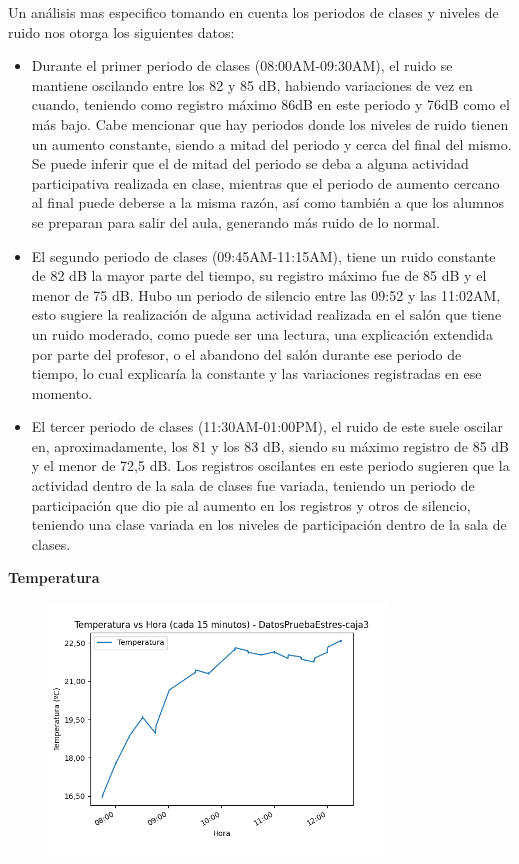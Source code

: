 \documentclass{templateNote}
\begin{document}
\begin{tcolorbox}
    Un análisis mas especifico tomando en cuenta los periodos de clases y niveles de ruido nos otorga los siguientes datos:
    \begin{itemize}
        \item Durante el primer periodo de clases (08:00AM-09:30AM), el ruido se mantiene oscilando entre los 82 y 85 dB, habiendo variaciones de vez en cuando, teniendo como registro máximo 86dB en este periodo y 76dB como el más bajo. Cabe mencionar que hay periodos donde los niveles de ruido tienen un aumento constante, siendo a mitad del periodo y cerca del final del mismo. Se puede inferir que el de mitad del periodo se deba a alguna actividad participativa realizada en clase, mientras que el periodo de aumento cercano al final puede deberse a la misma razón, así como también a que los alumnos se preparan para salir del aula, generando más ruido de lo normal.

        \item El segundo periodo de clases (09:45AM-11:15AM), tiene un ruido constante de 82 dB la mayor parte del tiempo, su registro máximo fue de 85 dB y el menor de 75 dB. Hubo un periodo de silencio entre las 09:52 y las 11:02AM, esto sugiere la realización de alguna actividad realizada en el salón que tiene un ruido moderado, como puede ser una lectura, una explicación extendida por parte del profesor, o el abandono del salón durante ese periodo de tiempo, lo cual explicaría la constante y las variaciones registradas en ese momento.
        
        \item El tercer periodo de clases (11:30AM-01:00PM), el ruido de este suele oscilar en, aproximadamente, los 81 y los 83 dB, siendo su máximo registro de 85 dB y el menor de 72,5 dB. Los registros oscilantes en este periodo sugieren que la actividad dentro de la sala de clases fue variada, teniendo un periodo de participación que dio pie al aumento en los registros y otros de silencio, teniendo una clase variada en los niveles de participación dentro de la sala de clases.
    \end{itemize}
\end{tcolorbox}

\newpage
\textbf{Temperatura}
\begin{figure}[H]
    \centering
    \includegraphics[width=0.8\textwidth]{img/DatosPruebaEstres-caja3_temperatura_vs_hora_15min.png}
\end{figure}
\end{document}
